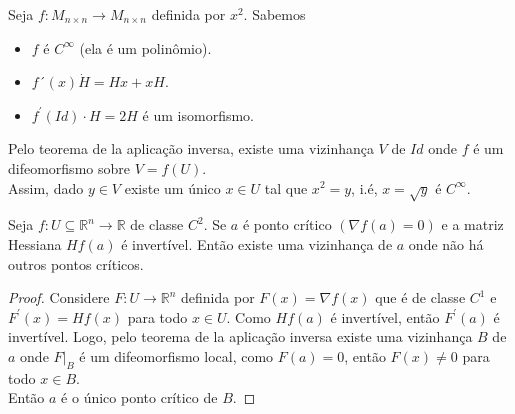 \begin{example}
  Seja $f:M_{n\times n}\to M_{n\times n}$ definida por $x^{2}$.
  Sabemos
  \begin{itemize}
    \item $f$ é $C^{\infty}$ (ela é um polinômio).
    \item $f´(x)\dot H=Hx+xH$.
    \item $f^{\prime}(Id)\cdot H=2H$ é um isomorfismo. 
  \end{itemize}
  Pelo teorema de la aplicação inversa, existe uma vizinhança $V$ de $Id$ onde $f$ é um difeomorfismo sobre $V=f(U)$.\\
  Assim, dado $y\in V$ existe um único $x\in U$ tal que $x^{2}=y$, i.é, $x=\sqrt{y}$ é $C^{\infty}$. 
\end{example}
\begin{corollary}
  Seja $f:U\subseteq \mathbb{R}^{n}\to\mathbb{R}$ de classe $C^{2}$. Se $a$ é ponto crítico $(\nabla f(a)=0)$ e a matriz Hessiana $Hf(a)$ é invertível. Então existe uma vizinhança de $a$ onde não há outros pontos críticos. 
\end{corollary}
\begin{proof} 
  Considere $F:U\to\mathbb{R}^{n}$ definida por $F(x)=\nabla f(x)$ que é de classe $C^{1}$ e $F^{\prime}(x)=Hf(x)$ para todo $x\in U$. Como $Hf(a)$ é invertível, então $F^{\prime}(a)$ é invertível. Logo, pelo teorema de la aplicação inversa existe uma vizinhança $B$ de $a$ onde $F\big|_{B}$ é um difeomorfismo local, como $F(a)=0$, então $F(x)\neq 0$ para todo $x\in B$.\\
  Então $a$ é o único ponto crítico de $B$. 
\end{proof}
